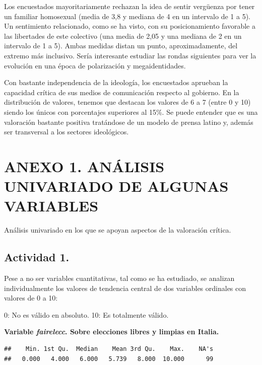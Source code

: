 \documentclass[
  12 pt,
  a4paper,
]{article}
\newenvironment{Shaded}{\begin{snugshade}}{\end{snugshade}}
\newcommand{\FunctionTok}[1]{\textcolor[rgb]{0.13,0.29,0.53}{\textbf{#1}}}
\newcommand{\NormalTok}[1]{#1}
\newcommand{\SpecialCharTok}[1]{\textcolor[rgb]{0.81,0.36,0.00}{\textbf{#1}}}
\begin{document}
Los encuestados mayoritariamente rechazan la idea de sentir vergüenza
por tener un familiar homosexual (media de 3,8 y mediana de 4 en un
intervalo de 1 a 5). Un sentimiento relacionado, como se ha visto, con
su posicionamiento favorable a las libertades de este colectivo (una
media de 2,05 y una mediana de 2 en un intervalo de 1 a 5). Ambas
medidas distan un punto, aproximadamente, del extremo más inclusivo.
Sería interesante estudiar las rondas siguientes para ver la evolución
en una época de polarización y megaidentidades.

Con bastante independencia de la ideología, los encuestados aprueban la
capacidad crítica de sus medios de comunicación respecto al gobierno. En
la distribución de valores, tenemos que destacan los valores de 6 a 7
(entre 0 y 10) siendo los únicos con porcentajes superiores al 15\%. Se
puede entender que es una valoración bastante positiva tratándose de un
modelo de prensa latino y, además ser transversal a los sectores
ideológicos.

\newpage

\section{ANEXO 1. ANÁLISIS UNIVARIADO DE ALGUNAS
VARIABLES}\label{anexo-1.-anuxe1lisis-univariado-de-algunas-variables}

Análisis univariado en los que se apoyan aspectos de la valoración
crítica.

\subsection{Actividad 1.}\label{actividad-1.}

Pese a no ser variables cuantitativas, tal como se ha estudiado, se
analizan individualmente los valores de tendencia central de dos
variables ordinales con valores de 0 a 10:

0: No es válido en absoluto. 10: Es totalmente válido.

\textbf{Variable \emph{fairelecc}. Sobre elecciones libres y limpias en
Italia.}

\begin{Shaded}
\end{Shaded}

\begin{verbatim}
##    Min. 1st Qu.  Median    Mean 3rd Qu.    Max.    NA's 
##   0.000   4.000   6.000   5.739   8.000  10.000      99
\end{verbatim}
\end{document}
